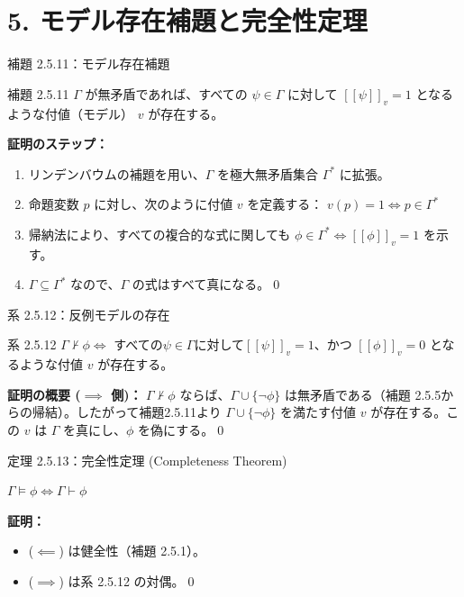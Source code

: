 \documentclass[unicode,10pt]{beamer}
\begin{document}
\section{5. モデル存在補題と完全性定理}

\begin{frame}{補題 2.5.11：モデル存在補題}
    \begin{block}{補題 2.5.11}
        $\Gamma$ が無矛盾であれば、すべての $\psi \in \Gamma$ に対して $[[\psi]]_v = 1$ となるような付値（モデル） $v$ が存在する。
    \end{block}
    
    \textbf{証明のステップ：}
    \begin{enumerate}
        \item リンデンバウムの補題を用い、$\Gamma$ を極大無矛盾集合 $\Gamma^*$ に拡張。
        \item 命題変数 $p$ に対し、次のように付値 $v$ を定義する：
        $v(p) = 1 \iff p \in \Gamma^*$
        \item 帰納法により、すべての複合的な式に関しても $\phi \in \Gamma^* \iff [[\phi]]_v = 1$ を示す。
        \item $\Gamma \subseteq \Gamma^*$ なので、$\Gamma$ の式はすべて真になる。\qed
    \end{enumerate}
\end{frame}

\begin{frame}{系 2.5.12：反例モデルの存在}
    \begin{block}{系 2.5.12}
        $\Gamma \not\vdash \phi \iff$ すべての$\psi \in \Gamma$に対して$[[\psi]]_v=1$、かつ $[[\phi]]_v=0$ となるような付値 $v$ が存在する。
    \end{block}
    
    \textbf{証明の概要 ($\implies$ 側)：}
    $\Gamma \not\vdash \phi$ ならば、$\Gamma \cup \{\neg\phi\}$ は無矛盾である（補題 2.5.5からの帰結）。したがって補題2.5.11より $\Gamma \cup \{\neg\phi\}$ を満たす付値 $v$ が存在する。この $v$ は $\Gamma$ を真にし、$\phi$ を偽にする。\qed
\end{frame}

\begin{frame}{定理 2.5.13：完全性定理 (Completeness Theorem)}
    \begin{center}
        \LARGE \textbf{$\Gamma \models \phi \iff \Gamma \vdash \phi$}
    \end{center}
    
    \vspace{1em}
    \textbf{証明：}
    \begin{itemize}
        \item ($\impliedby$) は健全性（補題 2.5.1）。
        \item ($\implies$) は系 2.5.12 の対偶。\qed
    \end{itemize}
\end{frame}
\end{document}

